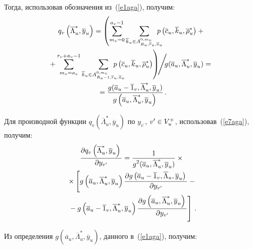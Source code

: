 \begin{multicols}{2}
     Тогда, использовав обозначения из~(\ref{e1aga}), получим:
     \begin{multline}
     q_v\left(\overline{\Lambda}^*_u, \overline{y}_u\right) = 
\left(\sum\limits_{m_v=0}^{a_v-1}\sum\limits_{\overline{k}_u \in 
A^{0,m_v}_{R_u, \overline{r}_u, \overline{a}_u}}\!\!\!\!\!\! p\left(\overline{c}_u, 
\overline{k}_u, \overline{\rho}_u^*\right)+{}\right.\\
\left.\hspace*{-5pt}{}+\sum\limits_{m_v=a_v}^{r_v+a_v-1} 
\sum\limits_{\overline{k}_u \in A^{0,m_v}_{R_u-1, \overline{r}_u, 
\overline{a}_u}}\!\!\!\!\!\!\!\!\!\!\!
p\left(\overline{c}_u, \overline{k}_u, \overline{\rho}_u^*\right)\right)\!\!\Bigg/\!\!
g(\overline{a}_u, \overline{\Lambda}^*_u, \overline{y}_u)={}\\
{}=
\fr{g(\overline{a}_u-\overline{1}_v,\overline{\Lambda}_u^*, 
\overline{y}_u)}{ g\left(\overline{a}_u, \overline{\Lambda}^*_u, \overline{y}_u\right) }\,.
     \label{e7aga}
     \end{multline}
      
     Для производной функции $q_v(\overline{\Lambda}_u^*, 
\overline{y}_u)$ по $y_{v^\prime}$, $v^\prime\hm\in V_u^+$, 
использовав~(\ref{e7aga}), получим:
     \begin{multline}
     \displaystyle\frac{\displaystyle \partial q_v\left(\overline{\Lambda}_u^*, \overline{y}_u\right)\mathstrut}{\displaystyle \partial 
y_{v^\prime}\mathstrut}=\displaystyle\frac{\displaystyle 1\mathstrut}{\displaystyle g^2(\overline{a}_u, \overline{\Lambda}_u^*, 
\overline{y}_u)\mathstrut}\times{}\\
     {}\times \left[ g\left(\overline{a}_u, \overline{\Lambda}_u^*, 
\overline{y}_u\right)\displaystyle\frac{\displaystyle \partial g \left(\overline{a}_u-
\overline{1}_v,\overline{\Lambda}_u,\overline{y}_u\right)\mathstrut}{\displaystyle \partial y_{v^\prime}\mathstrut}-{}\right.\\
\left.{}-
g\left(\overline{a}_u-\overline{1}_v, \overline{\Lambda}_u^*, 
\overline{y}_u\right)\displaystyle\frac{\displaystyle \partial g \left(\overline{a}_u, \overline{\Lambda}_u^*, 
\overline{y}_u\right)\mathstrut}{\displaystyle \partial y_{v^\prime}\mathstrut}\right]\,.
     \label{e8aga}
     \end{multline}
     
     Из определения $g(\overline{a}_u, \overline{\Lambda}_u^*, 
\overline{y}_u)$, данного в~(\ref{e1aga}), получим:



\end{multicols}
